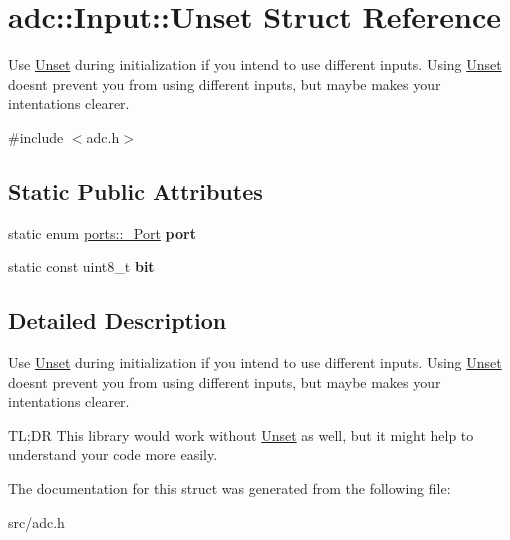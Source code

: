 \hypertarget{structadc_1_1Input_1_1Unset}{}\section{adc\+:\+:Input\+:\+:Unset Struct Reference}
\label{structadc_1_1Input_1_1Unset}


Use \hyperlink{structadc_1_1Input_1_1Unset}{Unset} during initialization if you intend to use different inputs. Using \hyperlink{structadc_1_1Input_1_1Unset}{Unset} doesn\textquotesingle{}t prevent you from using different inputs, but maybe makes your intentations clearer.  




{\ttfamily \#include $<$adc.\+h$>$}

\subsection*{Static Public Attributes}
\begin{DoxyCompactItemize}
\item 
static enum \hyperlink{namespaceports_a9949317f344930bd6ad1097e80c97b67}{ports\+::\+\_\+\+Port} {\bfseries port}\hypertarget{structadc_1_1Input_1_1Unset_a868a4d7db05686d8b09a4a5f9ca3f863}{}\label{structadc_1_1Input_1_1Unset_a868a4d7db05686d8b09a4a5f9ca3f863}

\item 
static const uint8\+\_\+t {\bfseries bit}\hypertarget{structadc_1_1Input_1_1Unset_a8fd44d9636034cbba06a1673af4dfa1a}{}\label{structadc_1_1Input_1_1Unset_a8fd44d9636034cbba06a1673af4dfa1a}

\end{DoxyCompactItemize}


\subsection{Detailed Description}
Use \hyperlink{structadc_1_1Input_1_1Unset}{Unset} during initialization if you intend to use different inputs. Using \hyperlink{structadc_1_1Input_1_1Unset}{Unset} doesn\textquotesingle{}t prevent you from using different inputs, but maybe makes your intentations clearer. 

TL;DR This library would work without \hyperlink{structadc_1_1Input_1_1Unset}{Unset} as well, but it might help to understand your code more easily. 

The documentation for this struct was generated from the following file\+:\begin{DoxyCompactItemize}
\item 
src/adc.\+h\end{DoxyCompactItemize}
